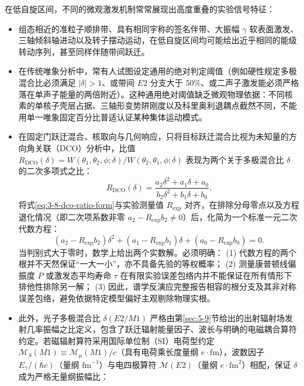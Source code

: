 在低自旋区间，不同的微观激发机制常常展现出高度重叠的实验信号特征：
\begin{itemize}
\item 组态相近的准粒子顺排带、具有相同宇称的签名伴带、大振幅 $\gamma$ 软表面激发、三轴倾斜轴进动以及转子摆动运动，在低自旋区间均可能给出近乎相同的能级转动序列，甚至同样伴随带间跃迁。
\item 在传统唯象分析中，常有人试图设定通用的绝对判定阈值（例如硬性规定多极混合比必须满足 $|\delta| > 1$、或带间 $E2$ 分支大于 $50\%$、或二声子激发能必须严格落在单声子能量的两倍附近）。这种通用绝对阈值缺乏微观物理依据：不同核素的单核子壳层占据、三轴形变势阱刚度以及科里奥利退耦点截然不同，不能用单一唯象固定百分比普适认证某种集体运动模式。
\item 在固定门跃迁混合、核取向与几何响应，只将目标跃迁混合比视为未知量的方向角关联（DCO）分析中，比值 $R_{\mathrm{DCO}}(\delta) = W(\theta_1, \theta_2, \phi; \delta) / W(\theta_2, \theta_1, \phi; \delta)$ 表现为两个关于多极混合比 $\delta$ 的二次多项式之比：
\begin{equation}\label{eq:3-8-dco-ratio-form}
R_{\mathrm{DCO}}(\delta) = \frac{a_2 \delta^2 + a_1 \delta + a_0}{b_2 \delta^2 + b_1 \delta + b_0} .
\end{equation}
将式\eqref{eq:3-8-dco-ratio-form}与实验测量值 $R_{\mathrm{exp}}$ 对齐，在排除分母零点以及方程退化情况（即二次项系数非零 $a_2 - R_{\mathrm{exp}} b_2 \neq 0$）后，化简为一个标准一元二次代数方程：
\begin{equation}\label{eq:3-8-dco-quadratic-root}
(a_2 - R_{\mathrm{exp}} b_2)\delta^2 + (a_1 - R_{\mathrm{exp}} b_1)\delta + (a_0 - R_{\mathrm{exp}} b_0) = 0 .
\end{equation}
当判别式大于零时，数学上给出两个实数解。必须明确：
(1) 代数方程的两个根并不天然保证“一大一小”，亦不具备先验的等权概率；
(2) 测量康普顿线偏振度 $P$ 或激发态平均寿命 $\tau$ 在有限实验误差包络内并不能保证在所有情形下排他性排除另一解；
(3) 因此，谱学反演应完整报告相容的根分支及其非对称误差包络，避免依据特定模型偏好主观剔除物理实根。
\item 此外，光子多极混合比 $\delta(E2/M1)$ 严格由第\ref{sec:5-9}节给出的出射辐射场发射几率振幅之比定义，包含了跃迁辐射能量因子、波长与明确的电磁耦合算符约定。若磁辐射算符采用国际单位制（SI）电荷型约定 $\mathcal{M}_S(M1) \equiv \mathcal{M}_\mu(M1)/c$（具有电荷乘长度量纲 $e\cdot\mathrm{fm}$），波数因子 $E_\gamma/(\hbar c)$（量纲 $\mathrm{fm}^{-1}$）与电四极算符 $\mathcal{M}(E2)$（量纲 $e\cdot\mathrm{fm}^2$）相配，保证 $\delta$ 成为严格无量纲振幅比：
\begin{equation}\label{eq:3-8-delta-def}

\end{equation}
\end{itemize}
